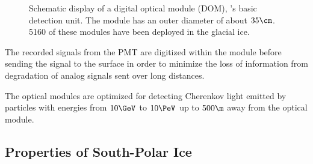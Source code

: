 \begin{figure}[htbp]
  \hfill
  \caption{Schematic display of a digital optical module (DOM), \icecube's basic detection unit. The module has an outer diameter of about $35\cm$. 5160 of these modules have been deployed in the glacial ice.}
  \label{fig:aK4raigh}
\end{figure}


The recorded signals from the PMT are digitized within the module before sending the signal to the surface in order to minimize the loss of information from degradation of analog signals sent over long distances. \cite{firstyearperformance}

The optical modules are optimized for detecting Cherenkov light emitted by particles with energies from $10\GeV$ to $10\PeV$ up to $500\m$ away from the optical module. \cite{instrumentation}


\subsection{Properties of South-Polar Ice}
\label{sec:ice}

